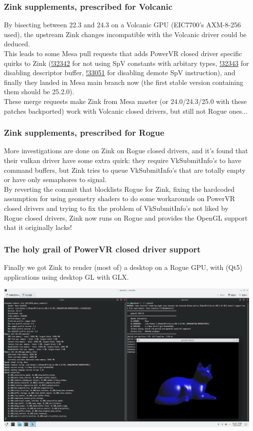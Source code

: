 \documentclass{beamer}
\begin{document}
\begin{frame}
	\frametitle{Zink supplements, prescribed for Volcanic}
	By bisecting between 22.3 and 24.3 on a Volcanic GPU (EIC7700's AXM-8-256 used), the upstream Zink changes incompatible with the Volcanic driver could be deduced. \\
	This leads to some Mesa pull requests that adds PowerVR closed driver specific quirks to Zink (\href{https://gitlab.freedesktop.org/mesa/mesa/-/merge_requests/32342}{!32342} for not using SpV constants with arbitary types, \href{https://gitlab.freedesktop.org/mesa/mesa/-/merge_requests/32343}{!32343} for disabling descriptor buffer, \href{https://gitlab.freedesktop.org/mesa/mesa/-/merge_requests/33051}{!33051} for disabling demote SpV instruction), and finally they landed in Mesa main branch now (the first stable version containing them should be 25.2.0). \\
	These merge requests make Zink from Mesa master (or 24.0/24.3/25.0 with these patches backported) work with Volcanic closed drivers, but still not Rogue ones...
\end{frame}

\begin{frame}
	\frametitle{Zink supplements, prescribed for Rogue}
	More investigations are done on Zink on Rogue closed drivers, and it's found that their vulkan driver have some extra quirk: they require VkSubmitInfo's to have command buffers, but Zink tries to queue VkSubmitInfo's that are totally empty or have only semaphores to signal. \\
	By reverting the commit that blocklists Rogue for Zink, fixing the hardcoded assumption for using geometry shaders to do some workarounds on PowerVR closed drivers and trying to fix the problem of VkSubmitInfo's not liked by Rogue closed drivers, Zink now runs on Rogue and provides the OpenGL support that it originally lacks!
\end{frame}

\begin{frame}
	\frametitle{The holy grail of PowerVR closed driver support}
	Finally we got Zink to render (most of) a desktop on a Rogue GPU, with (Qt5) applications using desktop GL with GLX.
	\begin{center}
		\includegraphics[scale=0.18]{rogue-zink-screenshot.png}
	\end{center}
\end{frame}
\end{document}
